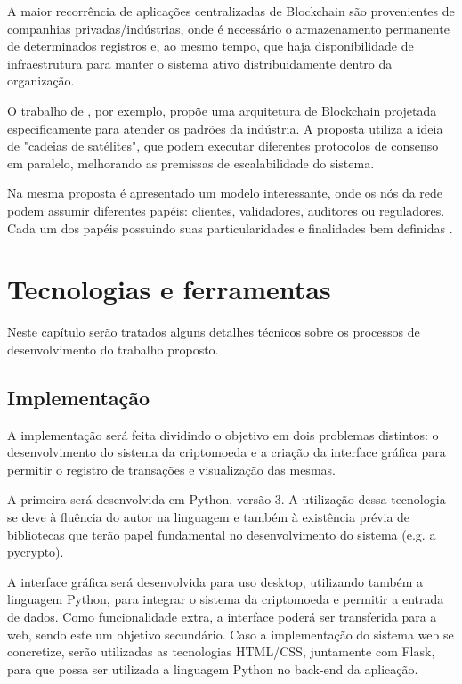 \documentclass[openright]{normas-utf-tex} %
\begin{document}
A maior recorrência de aplicações centralizadas de Blockchain são provenientes de companhias privadas/indústrias, onde é necessário o armazenamento permanente de determinados registros e, ao mesmo tempo, que haja disponibilidade de infraestrutura para manter o sistema ativo distribuidamente dentro da organização.

O trabalho de , por exemplo, propõe uma arquitetura de Blockchain
projetada especificamente para atender os padrões da indústria. A proposta utiliza a ideia de "cadeias de satélites", que podem executar diferentes protocolos de consenso em paralelo, melhorando as premissas de escalabilidade do sistema.

Na mesma proposta é apresentado um modelo interessante, onde os nós da rede podem assumir diferentes papéis: clientes, validadores, auditores ou reguladores. Cada um dos papéis possuindo suas particularidades e finalidades bem definidas \cite{Li2017}.


\chapter{Tecnologias e ferramentas}

Neste capítulo serão tratados alguns detalhes técnicos sobre os processos de desenvolvimento do trabalho proposto.

\section{Implementação}

A implementação será feita dividindo o objetivo em dois problemas distintos: o desenvolvimento do sistema da criptomoeda e a criação da interface gráfica para permitir o registro de transações e visualização das mesmas.

A primeira será desenvolvida em Python, versão 3. A utilização dessa tecnologia se deve à fluência do autor na linguagem e também à existência prévia de bibliotecas que terão papel fundamental no desenvolvimento do sistema (e.g. a pycrypto).

A interface gráfica será desenvolvida para uso desktop, utilizando também a linguagem Python, para integrar o sistema da criptomoeda e permitir a entrada de dados. Como funcionalidade extra, a interface poderá ser transferida para a web, sendo este um objetivo secundário. Caso a implementação do sistema web se concretize, serão utilizadas as tecnologias HTML/CSS, juntamente com Flask, para que possa ser utilizada a linguagem Python no back-end da aplicação.
\end{document}
